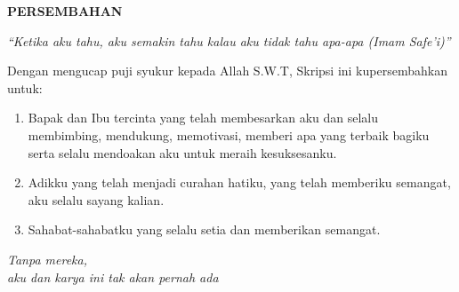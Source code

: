 ﻿\clearpage
{}
\begin{center}
    \textbf{\large PERSEMBAHAN}
\end{center}
\vspace{2cm}
\begin{center}
\textit{“Ketika aku tahu, aku semakin tahu kalau aku tidak tahu apa-apa (Imam Safe’i)”}
\end{center}
\vspace{2cm}
Dengan mengucap puji syukur kepada Allah S.W.T, Skripsi ini kupersembahkan untuk:
\begin{enumerate}
    \item Bapak dan Ibu tercinta yang telah membesarkan aku dan selalu membimbing, mendukung, memotivasi, memberi apa yang terbaik bagiku serta selalu mendoakan aku untuk meraih kesuksesanku.
    \item Adikku yang telah menjadi curahan hatiku, yang telah memberiku semangat, aku selalu sayang kalian.
    \item Sahabat-sahabatku yang selalu setia dan memberikan semangat.
\end{enumerate}
\vspace{2cm}
\begin{flushright}
\textit{Tanpa mereka,}\\
\textit{aku dan karya ini tak akan pernah ada}
\end{flushright}
